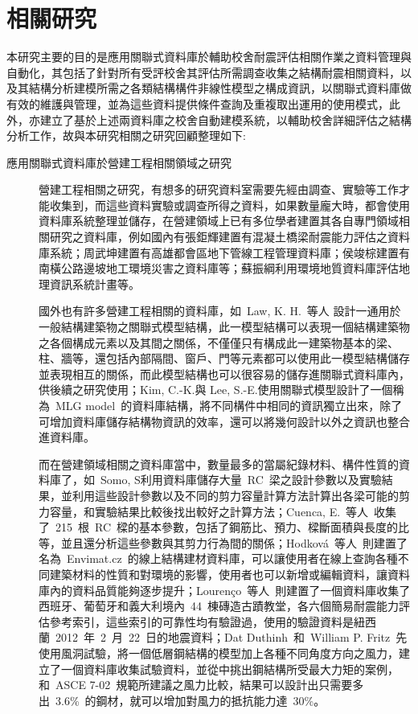 \renewcommand\thetable{\arabic{chapter}-\arabic{table}}
\renewcommand{\theequation}{\arabic{chapter}-\arabic{equation}}
\chapter{相關研究}

本研究主要的目的是應用關聯式資料庫於輔助校舍耐震評估相關作業之資料管理與自動化，其包括了針對所有受評校舍其評估所需調查收集之結構耐震相關資料，以及其結構分析建模所需之各類結構構件非線性模型之構成資訊，以關聯式資料庫做有效的維護與管理，並為這些資料提供條件查詢及重複取出運用的使用模式，此外，亦建立了基於上述兩資料庫之校舍自動建模系統，以輔助校舍詳細評估之結構分析工作，故與本研究相關之研究回顧整理如下:

\begin{description}
  \item[應用關聯式資料庫於營建工程相關領域之研究]
  營建工程相關之研究，有想多的研究資料室需要先經由調查、實驗等工作才能收集到，而這些資料實驗或調查所得之資料，如果數量龐大時，都會使用資料庫系統整理並儲存，在營建領域上已有多位學者建置其各自專門領域相關研究之資料庫，例如國內有張鉅輝\cite{chang2003master}建置有混凝土橋梁耐震能力評估之資料庫系統；周武坤\cite{chou2002master}建置有高雄都會區地下管線工程管理資料庫；侯竣棕\cite{hou2000master}建置有南橫公路邊坡地工環境災害之資料庫等；蘇振綱\cite{su2000master}利用環境地質資料庫評估地理資訊系統計畫等。

  國外也有許多營建工程相關的資料庫，如~Law, K. H.~等人\cite{law1990management} 設計一通用於一般結構建築物之關聯式模型結構，此一模型結構可以表現一個結構建築物之各個構成元素以及其間之關係，不僅僅只有構成此一建築物基本的梁、柱、牆等，還包括內部隔間、窗戶、門等元素都可以使用此一模型結構儲存並表現相互的關係，而此模型結構也可以很容易的儲存進關聯式資料庫內，供後續之研究使用；Kim, C.-K.與 Lee, S.-E.\cite{kim2000study}使用關聯式模型設計了一個稱為~MLG model~的資料庫結構，將不同構件中相同的資訊獨立出來，除了可增加資料庫儲存結構物資訊的效率，還可以將幾何設計以外之資訊也整合進資料庫。

  而在營建領域相關之資料庫當中，數量最多的當屬紀錄材料、構件性質的資料庫了，如~Somo, S\cite{somo2006modeling}利用資料庫儲存大量~RC~梁之設計參數以及實驗結果，並利用這些設計參數以及不同的剪力容量計算方法計算出各梁可能的剪力容量，和實驗結果比較後找出較好之計算方法；Cuenca, E.~等人\cite{Cuenca20131089}~收集了~215~根~RC~樑的基本參數，包括了鋼筋比、預力、樑斷面積與長度的比等，並且還分析這些參數與其剪力行為間的關係；Hodkov{\'a}~等人\cite{hodkova2011envimat}~則建置了名為~Envimat.cz~的線上結構建材資料庫，可以讓使用者在線上查詢各種不同建築材料的性質和對環境的影響，使用者也可以新增或編輯資料，讓資料庫內的資料品質能夠逐步提升；Louren{\c{c}}o~等人\cite{lourencco2013simplified}~則建置了一個資料庫收集了西班牙、葡萄牙和義大利境內~44~棟磚造古蹟教堂，各六個簡易耐震能力評估參考索引，這些索引的可靠性均有驗證過，使用的驗證資料是紐西蘭~2012~年~2~月~22~日的地震資料；Dat Duthinh~和~William P. Fritz\cite{duthinh2006nonlinear}~先使用風洞試驗，將一個低層鋼結構的模型加上各種不同角度方向之風力，建立了一個資料庫收集試驗資料，並從中挑出鋼結構所受最大力矩的案例，和~ASCE 7-02\cite{asce2002minimum}~規範所建議之風力比較，結果可以設計出只需要多出~3.6\%~的鋼材，就可以增加對風力的抵抗能力達~30\%。


\end{description}
